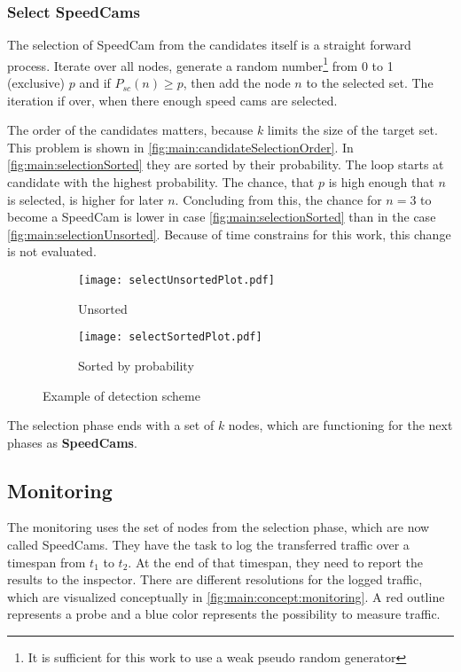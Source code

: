 \documentclass[thesis.tex]{subfiles}
\begin{document}
\subsubsection{Select SpeedCams} \label{sec:main:selectionPhase:selecting}

The selection of SpeedCam from the candidates itself is a straight forward process. Iterate over all nodes, generate a random number\footnote{It is sufficient for this work to use a weak pseudo random generator} from 0 to 1 (exclusive) $p$ and if $P_{sc}(n) \geq p$, then add the node $n$ to the selected set. The iteration if over, when there enough speed cams are selected.

The order of the candidates matters, because $k$ limits the size of the target set. This problem is shown in \autoref{fig:main:candidateSelectionOrder}. In \autoref{fig:main:selectionSorted} they are sorted by their probability. The loop starts at candidate with the highest probability. The chance, that $p$ is high enough that $n$ is selected, is higher for later $n$. Concluding from this, the chance for $n=3$ to become a SpeedCam is lower in case \autoref{fig:main:selectionSorted} than in the case \autoref{fig:main:selectionUnsorted}. Because of time constrains for this work, this change is not evaluated.
\begin{figure}[h]
    \begin{subfigure}{.45\linewidth}
        \centering
        \texttt{[image: selectUnsortedPlot.pdf]}
        \caption{Unsorted}
        \label{fig:main:selectionUnsorted}
    \end{subfigure}%
    \begin{subfigure}{0.45\linewidth}
        \centering
        \texttt{[image: selectSortedPlot.pdf]}
        \caption{Sorted by probability}
        \label{fig:main:selectionSorted}
    \end{subfigure}
    \caption{Example of detection scheme}
    \label{fig:main:candidateSelectionOrder}
\end{figure}

The selection phase ends with a set of $k$ nodes, which are functioning for the next phases as \textbf{SpeedCams}.

\subsection{Monitoring} \label{sec:main:monitoringphase}
The monitoring uses the set of nodes from the selection phase, which are now called SpeedCams. They have the task to log the transferred traffic over a timespan from $t_1$ to $t_2$. At the end of that timespan, they need to report the results to the inspector. There are different resolutions for the logged traffic, which are visualized conceptually in \autoref{fig:main:concept:monitoring}. A red outline represents a probe and a blue color represents the possibility to measure traffic.
\end{document}
